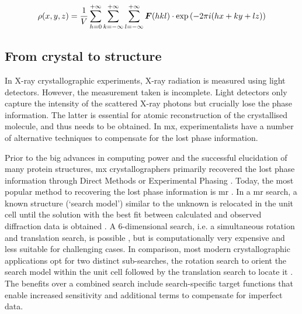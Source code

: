 \begin{equation}
    \rho(x,y,z)=\frac{1}{V}\sum_{h=0}^{+\infty}\sum_{k=-\infty}^{+\infty}\sum_{l=-\infty}^{+\infty}\boldsymbol{F}(hkl)\cdot \exp\left(-2\pi\\i(hx+ky+lz)\right)
    \label{eq:electron_density}
\end{equation}

\subsection{From crystal to structure}
In X-ray crystallographic experiments, X-ray radiation is measured using light detectors. However, the measurement taken is incomplete. Light detectors only capture the intensity of the scattered X-ray photons but crucially lose the phase information. The latter is essential for atomic reconstruction of the crystallised molecule, and thus needs to be obtained. In \gls{mx}, experimentalists have a number of alternative techniques to compensate for the lost phase information. 

Prior to the big advances in computing power and the successful elucidation of many protein structures, \gls{mx} crystallographers primarily recovered the lost phase information through Direct Methods or Experimental Phasing \cite{Rupp2010-nc}. Today, the most popular method to recovering the lost phase information is \gls{mr} \cite{Rossmann2001-yw,Rossmann1990-am}. In a \Gls{mr} search, a known structure (`search model') similar to the unknown is relocated in the unit cell until the solution with the best fit between calculated and observed diffraction data is obtained \cite{Rupp2010-nc}. A 6-dimensional search, i.e. a simultaneous rotation and translation search, is possible \cite{Kissinger1999-ho,Glykos2000-gc,Read2001-nu}, but is computationally very expensive and less suitable for challenging cases. In comparison, most modern crystallographic applications opt for two distinct sub-searches, the rotation search to orient the search model within the unit cell followed by the translation search to locate it \cite{Rupp2010-nc}. The benefits over a combined search include search-specific target functions that enable increased sensitivity and additional terms to compensate for imperfect data. 

